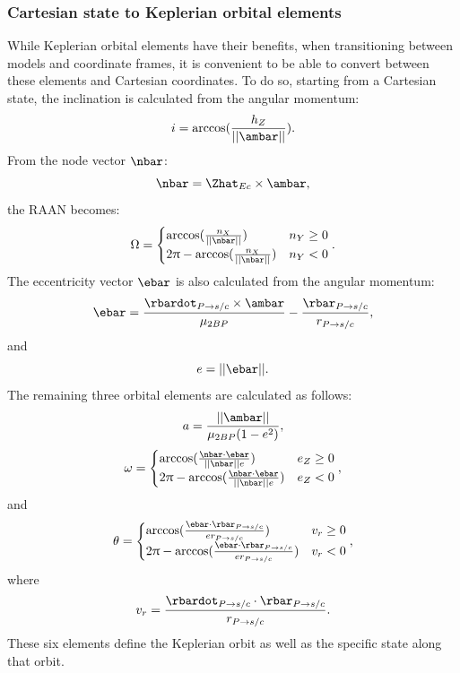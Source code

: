 \subsubsection{Cartesian state to Keplerian orbital elements}
While Keplerian orbital elements have their benefits, when transitioning between models and
coordinate frames, it is convenient to be able to convert between these elements and Cartesian
coordinates. To do so, starting from a Cartesian state, the inclination is calculated from the
angular momentum:
\begin{equation}
    i=\arccos(\frac{h_{Z}}{||\ambar||}).
    \label{eq:inclination}
\end{equation}
From the node vector $\nbar$:
\begin{equation}
    \nbar=\Zhat_{Ec}\times\ambar,
    \label{eq:nodes}
\end{equation}
the RAAN becomes:
\begin{equation}
    \Omega=\begin{cases}\arccos(\frac{n_{X}}{||\nbar||})&n_{Y}\geq0\cr2\pi-\arccos(\frac{n_{X}}{||\nbar||})&n_{Y}<0\end{cases}.
    \label{RAAN}
\end{equation}
The eccentricity vector $\ebar$ is also calculated from the angular momentum:
\begin{equation}
    \ebar=\frac{\rbardot_{P\rightarrow s/c}\times\ambar}{\mu_{2BP}}-\frac{\rbar_{P\rightarrow s/c}}{r_{P\rightarrow s/c}},
    \label{eq:eccentricityvector}
\end{equation}
and
\begin{equation}
    e=||\ebar||.
    \label{eq:eccentricity}
\end{equation}
The remaining three orbital elements are calculated as follows:
\begin{equation}
    a=\frac{||\ambar||}{\mu_{2BP}(1-e^{2})},
    \label{eq:semimajoraxis}
\end{equation}
\vspace{1mm}
\begin{equation}
    \omega=\begin{cases}\arccos(\frac{\nbar\cdot\ebar}{||\nbar||e})&e_{Z}\geq0\cr2\pi-\arccos(\frac{\nbar\cdot\ebar}{||\nbar||e})&e_{Z}<0\end{cases},
    \label{eq:argumentofperiapsis}
\end{equation}
and
\begin{equation}
    \theta=\begin{cases}\arccos(\frac{\ebar\cdot\rbar_{P\rightarrow s/c}}{er_{P\rightarrow s/c}})&v_{r}\geq0\cr2\pi-\arccos(\frac{\ebar\cdot\rbar_{P\rightarrow s/c}}{er_{P\rightarrow s/c}})&v_{r}<0\end{cases},
    \label{eq:trueanomaly}
\end{equation}
where
\begin{equation}
    v_{r}=\frac{\rbardot_{P\rightarrow s/c}\cdot\rbar_{P\rightarrow s/c}}{r_{P\rightarrow s/c}}.
    \label{eq:radialvelocity}
\end{equation}
These six elements define the Keplerian orbit as well as the specific state along that orbit.


